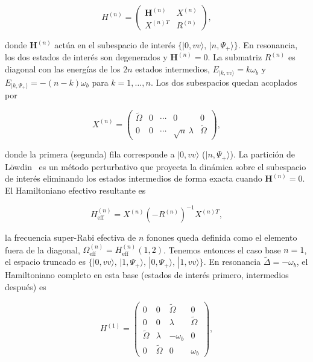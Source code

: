 \begin{equation}
	H^{(n)} = \begin{pmatrix}
		\mathbf{H}^{(n)} & X^{(n)} \\[4pt]
		X^{(n)T} & R^{(n)}
	\end{pmatrix},
	\label{eq:bloques}
\end{equation}

donde $\mathbf{H}^{(n)}$ actúa en el subespacio de interés $\{|0,vv\rangle,\,|n,\Psi_+\rangle\}$. En resonancia, los dos estados de interés son degenerados y $\mathbf{H}^{(n)} = 0$. La submatriz $R^{(n)}$ es diagonal con las energías de los $2n$ estados intermedios, $E_{|k,vv\rangle} = k\omega_b$ y $E_{|k,\Psi_+\rangle} = -(n-k)\omega_b$ para $k=1,\ldots,n$. Los dos subespacios quedan acoplados por

\begin{equation}
	X^{(n)} = \begin{pmatrix}
		\widetilde\Omega & 0 & \cdots & 0 & 0 \\
		0 & 0 & \cdots & \sqrt{n}\,\lambda & \widetilde\Omega
	\end{pmatrix},
	\label{eq:Xn}
\end{equation}

donde la primera (segunda) fila corresponde a $|0,vv\rangle$ ($|n,\Psi_+\rangle$). La partición de Löwdin~\cite{lowdin1951} es un método perturbativo que proyecta la dinámica sobre el subespacio de interés eliminando los estados intermedios de forma exacta cuando $\mathbf{H}^{(n)}=0$. El Hamiltoniano efectivo resultante es

\begin{equation}
	H_\mathrm{eff}^{(n)} = X^{(n)}\!\left(-R^{(n)}\right)^{-1}\!X^{(n)T},
	\label{eq:Lowdin}
\end{equation}

la frecuencia super-Rabi efectiva de $n$ fonones queda definida como el elemento fuera de la diagonal, $\Omega_\mathrm{eff}^{(n)} = H_\mathrm{eff}^{(n)}(1,2)$. Tenemos entonces el caso base $n=1$, el espacio truncado es $\{|0,vv\rangle,\allowbreak\,|1,\Psi_+\rangle,\allowbreak\, |0,\Psi_+\rangle,\allowbreak\,|1,vv\rangle\}$. En resonancia $\widetilde\Delta = -\omega_b$, el Hamiltoniano completo en esta base (estados de interés primero, intermedios después) es

\begin{equation}
	H^{(1)} = \begin{pmatrix}
		0 & 0 & \widetilde\Omega & 0 \\[4pt]
		0 & 0 & \lambda & \widetilde\Omega \\[4pt]
		\widetilde\Omega & \lambda & -\omega_b & 0 \\[4pt]
		0 & \widetilde\Omega & 0 & \omega_b
	\end{pmatrix},
	\label{eq:H1}
\end{equation}

